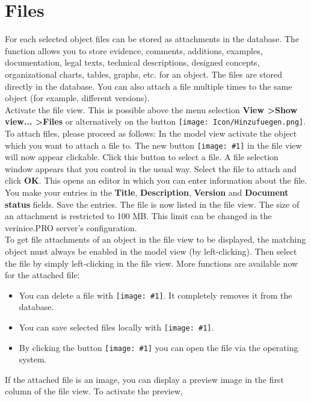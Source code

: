 \documentclass[a4paper,10pt]{book}
\newcommand{\icon}[1]{\texttt{[image: \#1]}}
\begin{document}
\section{Files} \label{Files}
For each selected object files can be stored as attachments in the database. The function allows you to store evidence, comments, additions, examples,
documentation, legal texts, technical descriptions, designed concepts, organizational charts, tables, graphs, etc. for an object. The files are stored directly
in the database. You can also attach a file multiple times to the same object (for example, different versions).
\newline\\
Activate the file view. This is possible above the menu selection \textbf{View \textgreater Show view... \textgreater Files} or alternatively
on the button \texttt{[image: Icon/Hinzufuegen.png]}.
\newline\\
To attach files, please proceed as follows: In the model view activate the object which you want to attach a file to.
The new button \icon{Icon/Oeffnen.png} in the file view will now appear clickable. Click this button to select a file. A file selection
window appears that you control in the usual way. Select the file to attach and click \textbf{OK}. This opens an editor in which you can enter information
about the file. You make your entries in the \textbf{Title}, \textbf{Description}, \textbf{Version} and \textbf{Document status} fields. Save the entries. The file is now listed in the file view. The size of an attachment is restricted to 100 MB. This limit can be changed in the verinice.PRO server's configuration.
\newline\\
To get file attachments of an object in the file view to be displayed, the matching object must always be enabled in the model view (by left-clicking).
Then select the file by simply left-clicking in the file view. More functions are available now for the attached file:
\begin{itemize}
 \item You can delete a file with \icon{Icon/Delete.png}. It completely removes it from the database.
 \item You can save selected files locally with \icon{Icon/Save.png}.
 \item By clicking the button \icon{Icon/Suchen.png} you can open the file via the operating system.
\end{itemize}
If the attached file is an image, you can display a preview image in the first column of the file view. To activate the preview,
\end{document}
